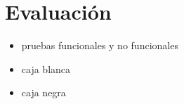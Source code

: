 \chapter{Evaluación}
\label{chap:evaluación}

\begin{itemize}
\item pruebas funcionales y no funcionales
\item caja blanca
\item caja negra
\end{itemize}
